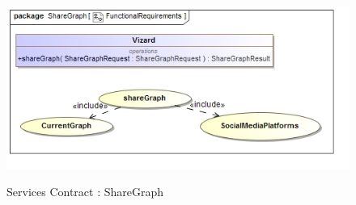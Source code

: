 \documentclass[a4paper,12pt]{article}
\begin{document}
	\begin{figure}[H]
		\includegraphics[width=\textwidth]{Images/uc__ShareGraph}  \\
		\caption{Services Contract : ShareGraph}
	\end{figure}
\end{document}

